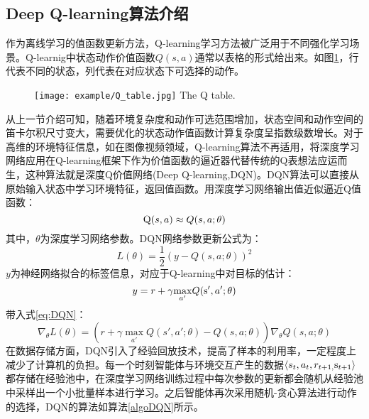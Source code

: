 \subsection{Deep Q-learning算法介绍}
作为离线学习的值函数更新方法，Q-learning学习方法被广泛用于不同强化学习场景。Q-learnig中状态动作价值函数$Q(s,a)$通常以表格的形式给出来。如图\ref{fig:8}，行代表不同的状态，列代表在对应状态下可选择的动作。
\begin{figure}[htpb]
	\centering
	\texttt{[image: example/Q\_table.jpg]}
	{The Q table.}
	\label{fig:8}
\end{figure}
从上一节介绍可知，随着环境复杂度和动作可选范围增加，状态空间和动作空间的笛卡尔积尺寸变大，需要优化的状态动作值函数计算复杂度呈指数级数增长。对于高维的环境特征信息，如在图像视频领域，Q-learning算法不再适用，将深度学习网络应用在Q-learning框架下作为价值函数的逼近器代替传统的Q表想法应运而生，这种算法就是深度Q价值网络(Deep Q-learning,DQN)。DQN算法可以直接从原始输入状态中学习环境特征，返回值函数。用深度学习网络输出值近似逼近Q值函数：
\begin{equation}
	{\rm{Q}}(s,a) \approx Q(s,a;\theta )
\end{equation}
其中，$\theta $为深度学习网络参数。DQN网络参数更新公式为：
\begin{equation}
\label{eq:DQN}
L(\theta ) = \frac{1}{2}{(y - Q(s,a;\theta ))^2}
\end{equation}
$y$为神经网络拟合的标签信息，对应于Q-learning中对目标的估计：
\begin{equation}
y = r + \gamma {\max _{a'}}Q({\rm{s'}},a';\theta )
\end{equation}
带入式\ref{eq:DQN}：
\begin{equation}
\label{eq:DQN2}
	{\nabla _\theta }L(\theta ) = (r + \gamma \mathop {\max }\limits_{a'} Q(s',a';\theta ) - Q(s,a;\theta )){\nabla _\theta }Q(s,a;\theta )
\end{equation}
在数据存储方面，DQN引入了经验回放技术，提高了样本的利用率，一定程度上减少了计算机的负担。每一个时刻智能体与环境交互产生的数据$ \left\langle {{s_t},{a_t},{r_{t + 1,}}{{\rm{s}}_{t + 1}}} \right\rangle $ 都存储在经验池中，在深度学习网络训练过程中每次参数的更新都会随机从经验池中采样出一个小批量样本进行学习。之后智能体再次采用随机-贪心算法进行动作的选择，DQN的算法如算法\ref{algoDQN}所示。

